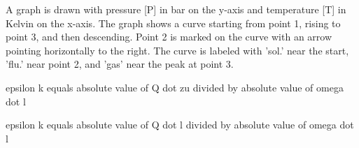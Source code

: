 A graph is drawn with pressure [P] in bar on the y-axis and temperature [T] in Kelvin on the x-axis. The graph shows a curve starting from point 1, rising to point 3, and then descending. Point 2 is marked on the curve with an arrow pointing horizontally to the right. The curve is labeled with 'sol.' near the start, 'flu.' near point 2, and 'gas' near the peak at point 3.

epsilon k equals absolute value of Q dot zu divided by absolute value of omega dot l

epsilon k equals absolute value of Q dot l divided by absolute value of omega dot l